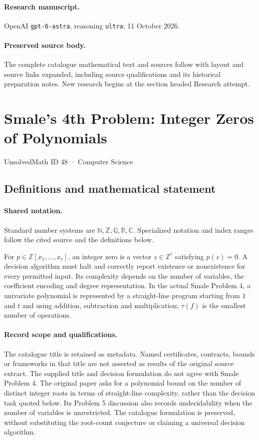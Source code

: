 \documentclass[11pt]{article}
\begin{document}
\paragraph{Research manuscript.} OpenAI \texttt{gpt-6-astra}, reasoning \texttt{ultra}; 11 October 2026.
\paragraph{Preserved source body.} The complete catalogue mathematical text and sources follow with layout and source links expanded, including source qualifications and its historical preparation notes. New research begins at the section headed Research attempt.

\section{Smale's 4th Problem: Integer Zeros of Polynomials}\label{48}
{\small UnsolvedMath ID 48 · Computer Science}
\subsection{Definitions and mathematical statement}

\paragraph{Shared notation.}Standard number systems are $\mathbb N,\mathbb Z,\mathbb Q,\mathbb R,\mathbb C$. Specialized notation and index ranges follow the cited source and the definitions below.


For $p\in\mathbb Z[x_1,\ldots,x_r]$, an integer zero is a vector $z\in\mathbb Z^r$ satisfying $p(z)=0$. A decision algorithm must halt and correctly report existence or nonexistence for every permitted input. Its complexity depends on the number of variables, the coefficient encoding and degree representation. In the actual Smale Problem 4, a univariate polynomial is represented by a straight-line program starting from $1$ and $t$ and using addition, subtraction and multiplication; $\tau(f)$ is the smallest number of operations.
\paragraph{Record scope and qualifications.}
The catalogue title is retained as metadata. Named certificates, contracts, bounds or frameworks in that title are not asserted as results of the original source extract.
The supplied title and decision formulation do not agree with Smale Problem 4. The original paper asks for a polynomial bound on the number of distinct integer roots in terms of straight-line complexity, rather than the decision task quoted below. Its Problem 5 discussion also records undecidability when the number of variables is unrestricted. The catalogue formulation is preserved, without substituting the root-count conjecture or claiming a universal decision algorithm.
\end{document}
